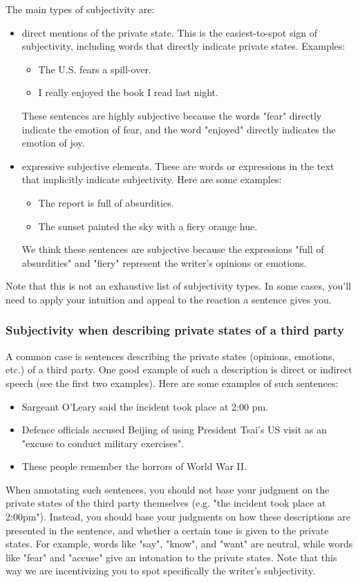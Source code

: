\documentclass[a4paper,14pt]{extarticle}
\begin{document}
The main types of subjectivity are:
\begin{itemize}
    \item direct mentions of the private state. This is the easiest-to-spot sign of subjectivity, including words that directly indicate private states. Examples: \begin{itemize}
        \item The U.S. fears a spill-over.
        \item I really enjoyed the book I read last night.
    \end{itemize}
    These sentences are highly subjective because the words "fear" directly indicate the emotion of fear, and the word "enjoyed" directly indicates the emotion of joy.
    \item expressive subjective elements. These are words or expressions in the text that implicitly indicate subjectivity. Here are some examples:
    \begin{itemize}
        \item The report is full of absurdities.
        \item The sunset painted the sky with a fiery orange hue.
    \end{itemize}
    We think these sentences are subjective because the expressions "full of absurdities" and "fiery" represent the writer's opinions or emotions.
\end{itemize}
Note that this is not an exhaustive list of subjectivity types. In some cases, you'll need to apply your intuition and appeal to the reaction a sentence gives you.

\subsubsection*{Subjectivity when describing private states of a third party}
A common case is sentences describing the private states (opinions, emotions, etc.) of a third party. One good example of such a description is direct or indirect speech (see the first two examples). Here are some examples of such sentences:
\begin{itemize}
    \item Sargeant O’Leary said the incident took place at 2:00 pm.
    \item Defence officials accused Beijing of using President Tsai's US visit as an "excuse to conduct military exercises".
    \item These people remember the horrors of World War II.
\end{itemize}
When annotating such sentences, you should not base your judgment on the private states of the third party themselves (e.g. "the incident took place at 2:00pm"). Instead, you should base your judgments on how these descriptions are presented in the sentence, and whether a certain tone is given to the private states. For example, words like "say", "know", and "want" are neutral, while words like "fear" and "accuse" give an intonation to the private states. Note that this way we are incentivizing you to spot specifically the writer's subjectivity.
\end{document}
